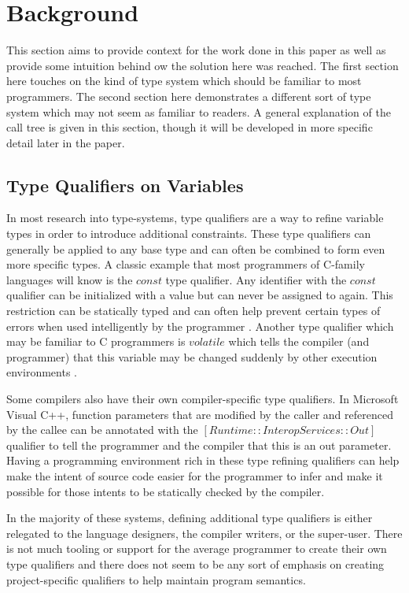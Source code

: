 \chapter{Background}

This section aims to provide context for the work done in this paper as well as provide some intuition behind ow the solution here was reached.  The first section here touches on the kind of type system which should be familiar to most programmers.  The second section here demonstrates a different sort of type system which may not seem as familiar to readers.  A general explanation of the call tree is given in this section, though it will be developed in more specific detail later in the paper.  

\section{Type Qualifiers on Variables}\label{sec:bac:varqual}

In most research into type-systems, type qualifiers are a way to refine variable types in order to introduce additional constraints.  These type qualifiers can generally be applied to any base type and can often be combined to form even more specific types.  A classic example that most programmers of C-family languages will know is the $const$ type qualifier.  Any identifier with the $const$ qualifier can be initialized with a value but can never be assigned to again.  This restriction can be statically typed and can often help prevent certain types of errors when used intelligently by the programmer \cite{theory-of-qual}.  Another type qualifier which may be familiar to C programmers is $volatile$ which tells the compiler (and programmer) that this variable may be changed suddenly by other execution environments \cite{theory-of-qual}.

Some compilers also have their own compiler-specific type qualifiers.  In Microsoft Visual C++, function parameters that are modified by the caller and referenced by the callee can be annotated with the $[Runtime::InteropServices::Out]$ qualifier to tell the programmer and the compiler that this is an out parameter.  Having a programming environment rich in these type refining qualifiers can help make the intent of source code easier for the programmer to infer and make it possible for those intents to be statically checked by the compiler.  

In the majority of these systems, defining additional type qualifiers is either relegated to the language designers, the compiler writers, or the super-user.  There is not much tooling or support for the average programmer to create their own type qualifiers and there does not seem to be any sort of emphasis on creating project-specific qualifiers to help maintain program semantics.

